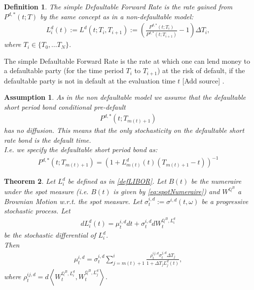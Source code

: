\documentclass[12pt]{article}
\newtheorem{assumption}{Assumption}[section]
\newtheorem{theorem}{Theorem}[section]
\newtheorem{definition}[theorem]{Definition}
\begin{document}
	\begin{definition}
		The \emph{simple Defaultable Forward Rate} is the rate gained from \(P^{d,*}(t; T)\) by the same concept as in a non-defaultable model:
		\begin{align}\label{defLIBOR}
		L^{d}_i(t) := L^{d}(t; T_i, T_{i+1}) := \left( \frac{P^{d,*}(t; T_i)}{P^{d,*}(t; T_{i+1})} - 1\right) \Delta T_i,
		\end{align}
		where \(T_i \in \{T_0, ... T_N\}\).
	\end{definition}
	The simple Defaultable Forward Rate is the rate at which one can lend money to a defaultable party (for the time period \(T_i\) to \(T_{i+1}\)) at the risk of default, if the defaultable party is not in default at the evaluation time \(t\) \color{red}[Add source]\color{black} %
	.
	
	\begin{assumption}
		\label{as:DLMMShortPeriodBond}
		As in the non defaultable model we assume that the defaultable short period bond conditional pre-default
		\begin{align*}
			P^{d,*}(t;T_{m(t)+1})
		\end{align*}
		has no diffusion. This means that the only stochasticity on the defaultable short rate bond is the default time.\\
		I.e. we specify the defaultable short period bond as:
		\begin{align*}
			P^{d,*}(t;T_{m(t)+1}) = (1 + L^d_{m(t)}(t)(T_{m(t)+1} - t))^{-1}
		\end{align*}
	\end{assumption}
	
	\begin{theorem}\label{theo:defDriftTheo}
		Let $L^d_i$ be defined as in \cref{defLIBOR}. Let $B(t)$ be the numeraire under the spot measure (i.e. $B(t)$ is given by \cref{eq:spotNumeraire}) and $W^{\mathbb{Q}^B}$ a Brownian Motion w.r.t. the spot measure.
		Let $\sigma^{i, d}_t:=\sigma^{i, d}(t, \omega)$ be a progressive stochastic process. Let 
		\begin{align}
			dL^d_i(t) = \mu^{i, d}_t dt + \sigma^{i, d}_t dW^{\mathbb{Q}^B, L^d_i}_t
		\end{align}
		be the stochastic differential of $L^d_i$.\\
		Then 
		\begin{align}\label{defDriftTheo}
			\mu^{i, d}_t = \sigma^{i, d}_t\sum_{j=m(t)+1}^{i}\frac{\rho^{i j, d}_t \sigma^{j, d}_t\Delta T_j}{1 + \Delta T_j L^d_j(t)},
		\end{align}
		where $ \rho^{i j, d}_t = d\left\langle W^{\mathbb{Q}^B, L^d_i}_t,  W^{\mathbb{Q}^B, L^d_j}_t \right\rangle $.
	\end{theorem}
	
\end{document}

